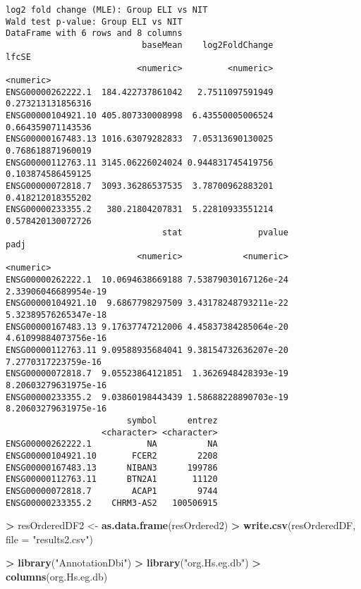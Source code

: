 \documentclass[
]{article}
\newenvironment{Shaded}{\begin{snugshade}}{\end{snugshade}}
\newcommand{\DataTypeTok}[1]{\textcolor[rgb]{0.13,0.29,0.53}{#1}}
\newcommand{\KeywordTok}[1]{\textcolor[rgb]{0.13,0.29,0.53}{\textbf{#1}}}
\newcommand{\NormalTok}[1]{#1}
\newcommand{\OperatorTok}[1]{\textcolor[rgb]{0.81,0.36,0.00}{\textbf{#1}}}
\newcommand{\StringTok}[1]{\textcolor[rgb]{0.31,0.60,0.02}{#1}}
\begin{document}
\begin{verbatim}
log2 fold change (MLE): Group ELI vs NIT 
Wald test p-value: Group ELI vs NIT 
DataFrame with 6 rows and 8 columns
                           baseMean    log2FoldChange             lfcSE
                          <numeric>         <numeric>         <numeric>
ENSG00000262222.1  184.422737861042   2.7511097591949 0.273213131856316
ENSG00000104921.10 405.807330008998  6.43550005006524 0.664359071143536
ENSG00000167483.13 1016.63079282833  7.05313690130025 0.768618871960019
ENSG00000112763.11 3145.06226024024 0.944831745419756 0.103874586459125
ENSG00000072818.7  3093.36286537535  3.78700962883201 0.418212018355202
ENSG00000233355.2   380.21804207831  5.22810933551214 0.578420130072726
                               stat               pvalue                 padj
                          <numeric>            <numeric>            <numeric>
ENSG00000262222.1  10.0694638669188 7.53879030167126e-24 2.33906046689954e-19
ENSG00000104921.10  9.6867798297509 3.43178248793211e-22 5.32389576265347e-18
ENSG00000167483.13 9.17637747212006 4.45837384285064e-20 4.61099884073756e-16
ENSG00000112763.11 9.09588935684041 9.38154732636207e-20  7.2770317223759e-16
ENSG00000072818.7  9.05523864121851  1.3626948428393e-19 8.20603279631975e-16
ENSG00000233355.2  9.03860198443439 1.58688228890703e-19 8.20603279631975e-16
                        symbol      entrez
                   <character> <character>
ENSG00000262222.1           NA          NA
ENSG00000104921.10       FCER2        2208
ENSG00000167483.13      NIBAN3      199786
ENSG00000112763.11      BTN2A1       11120
ENSG00000072818.7        ACAP1        9744
ENSG00000233355.2    CHRM3-AS2   100506915
\end{verbatim}

\begin{Shaded}
\begin{Highlighting}[]
\OperatorTok{>}\StringTok{ }\NormalTok{resOrderedDF2 <-}\StringTok{ }\KeywordTok{as.data.frame}\NormalTok{(resOrdered2)}
\OperatorTok{>}\StringTok{ }\KeywordTok{write.csv}\NormalTok{(resOrderedDF, }\DataTypeTok{file =} \StringTok{"results2.csv"}\NormalTok{)}
\end{Highlighting}
\end{Shaded}

\begin{Shaded}
\begin{Highlighting}[]
\OperatorTok{>}\StringTok{ }\KeywordTok{library}\NormalTok{(}\StringTok{"AnnotationDbi"}\NormalTok{)}
\OperatorTok{>}\StringTok{ }\KeywordTok{library}\NormalTok{(}\StringTok{"org.Hs.eg.db"}\NormalTok{)}
\OperatorTok{>}\StringTok{ }\KeywordTok{columns}\NormalTok{(org.Hs.eg.db)}
\end{Highlighting}
\end{Shaded}
\end{document}
